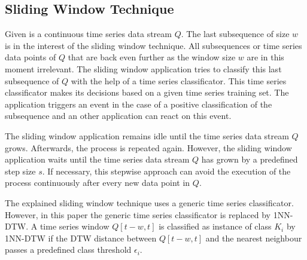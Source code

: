\subsection{Sliding Window Technique} \label{sliding_window_technique}
Given is a continuous time series data stream $Q$. The last subsequence of size $w$ is in the interest of the sliding
window technique. All subsequences or time series data points of $Q$ that are back even further as the window size $w$
are in this moment irrelevant. The sliding window application tries to classify this last subsequence of $Q$ with the
help of a time series classificator. This time series classificator makes its decisions based on a given time series
training set. The application triggers an event in the case of a positive classification of the subsequence and an other
application can react on this event.

The sliding window application remains idle until the time series data stream $Q$
grows. Afterwards, the process is repeated again. However, the sliding window application waits until the time series
data stream $Q$ has grown by a predefined step size $s$. If necessary, this stepwise approach can avoid the execution of
the process continuously after every new data point in $Q$.

The explained sliding window technique uses a generic time series classificator. However, in this paper the
generic time series classificator is replaced by 1NN-DTW. A time series window $Q[t-w,t]$ is classified as instance of
class $K_i$ by 1NN-DTW if the DTW distance between $Q[t-w,t]$ and the nearest neighbour passes a predefined
class threshold $\epsilon_i$.
